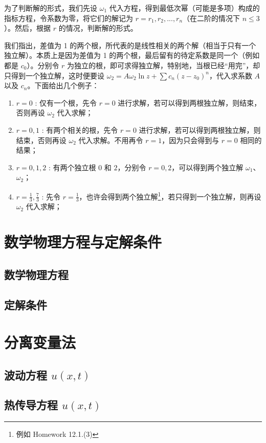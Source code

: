 \documentclass[UTF8]{report}
\theoremstyle{MyLineTheoremStyle} %
\theoremstyle{MyBlockTheoremStyle} %
\theoremstyle{MySubsubsectionStyle} %
\begin{document}
为了判断解的形式，我们先设 $\omega_1$ 代入方程，得到最低次幂（可能是多项）构成的指标方程，令系数为零，将它们的解记为 $r = r_1, r_2, ..., r_n$（在二阶的情况下 $n \leqslant 3$）。然后，根据 $r$ 的情况，判断解的形式。

我们指出，差值为 1 的两个根，所代表的是线性相关的两个解（相当于只有一个独立解）。本质上是因为差值为 1 的两个根，最后留有的待定系数是同一个（例如都是 $c_0$）。分别令 $r$ 为独立的根，即可求得独立解，特别地，当根已经“用完”，却只得到一个独立解，这时便要设 $\omega_2 = A \omega_2 \ln z + \sum c_n (z - z_0)^n$，代入求系数 $A$ 以及 $c_n$。下面给出几个例子：
\begin{enumerate}
\item $r = 0$ : 仅有一个根，先令 $r = 0$ 进行求解，若可以得到两根独立解，则结束，否则再设 $\omega_2$ 代入求解；
\item $r = 0, 1$ : 有两个相关的根，先令 $r = 0$ 进行求解，若可以得到两根独立解，则结束，否则再设 $\omega_2$ 代入求解。不用再令 $r = 1$，因为只会得到与 $r = 0$ 相同的结果；
\item $r = 0, 1, 2$ : 有两个独立根 $0$ 和 $2$，分别令 $r = 0, 2$，可以得到两个独立解 $\omega_1$、$\omega_2$；
\item $r = \frac{1}{3}, \frac{7}{3}$ : 先令 $r = \frac{1}{3}$，也许会得到两个独立解\footnote{例如 Homework 12.1.(3)}，若只得到一个独立解，则再设 $\omega_2$ 代入求解；
\end{enumerate} 

\chapter{数学物理方程与定解条件}\thispagestyle{fancy}
\section{数学物理方程}


\section{定解条件}


\chapter{分离变量法}\thispagestyle{fancy}
\section{波动方程 $u(x, t)$}
\section{热传导方程 $u(x, t)$}
\end{document}
